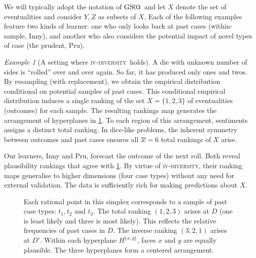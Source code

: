 \documentclass[ecta,nameyear,draft]{econsocart}
\newcommand{\fourdiv}{\textsc{iv}-\textsc{diversity}}
\newcommand{\gsii}{$\textup{GS03}$}
\theoremstyle{plain}
\theoremstyle{remark}
\newtheorem{example}{Example}%
\begin{document}
We will typically adopt the notation of \gsii\ and let $X$ denote the set of
eventualities and consider $Y, Z$ as subsets of $X$.
Each of the following examples
feature two kinds of learner: one who only looks back at past cases
(within-sample, Inny), and another who also considers the potential impact of
novel types of case (the prudent, Pru).

\begin{example}[A setting where \fourdiv\ holds]\label{eg-tali}
  A die with unknown number of sides is ``rolled'' over and
  over again. So far, it has produced only ones and twos. By resampling 
  (with replacement), we obtain the empirical distribution conditional on
  potential samples of past cases. This conditional empirical distribution
  induces a single ranking of the set $X=\{1, 2, 3\}$ of eventualities
  (outcomes) for each sample. The resulting rankings map generates the
  arrangement of hyperplanes in \cref{fig-tali}.  To each region of this
  arrangement, {sentiments} assigns a distinct total ranking.  
  In dice-like problems, the inherent symmetry between outcomes and past cases
  ensures all $3!=6$ total rankings of $X$ arise.
 
  Our learners, Inny and {Pru}, forecast the outcome of the next roll.  Both
  reveal plausibility rankings that agree with \cref{fig-tali}. By virtue of
  \fourdiv, their ranking maps generalise to higher dimensions (four case
  types) without any need for external validation. The data is sufficiently
  rich for making predictions about $X$.
  \begin{figure}
    \centering  \caption{\label{fig-tali} Each
      rational point in this simplex corresponds to a sample of past case
      types: $t_1, t_2$ and $t_3$.  The total ranking $(1, 2, 3)$ arises at $D$
      (one is least likely and three is most likely). This reflects the
      relative frequencies of past cases in $D$.  The inverse ranking $(3, 2,
      1)$ arises at $D'$. Within each hyperplane $H^{\{x,y\}}$, faces $x$ and
      $y$ are equally plausible.  The three hyperplanes form a centered
    arrangement.}
  \end{figure}
\end{example}
\end{document}
